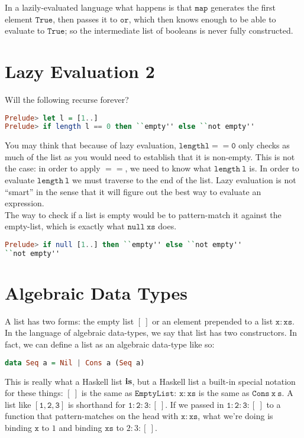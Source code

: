 \documentclass[a4paper,12pt]{article}
\newcommand{\kwa}[1]{\mathtt{#1}}
\begin{document}
\noindent
In a lazily-evaluated language what happens is that $\kwa{map}$ generates the first element $\kwa{True}$, then passes it to $\kwa{or}$, which then knows enough to be able to evaluate to $\kwa{True}$; so the intermediate list of booleans is never fully constructed.\\

\section{Lazy Evaluation 2}

\noindent
Will the following recurse forever?
\begin{lstlisting}[language=Haskell]
Prelude> let l = [1..]
Prelude> if length l == 0 then ``empty'' else ``not empty''
\end{lstlisting}

\noindent
You may think that because of lazy evaluation, $\kwa{length l == 0}$ only checks as much of the list as you would need to establish that it is non-empty. This is not the case: in order to apply $\kwa{==}$, we need to know what $\kwa{length~l}$ is. In order to evaluate $\kwa{length~l}$ we must traverse to the end of the list. Lazy evaluation is not ``smart'' in the sense that it will figure out the best way to evaluate an expression. \\

\noindent
The way to check if a list is empty would be to pattern-match it against the empty-list, which is exactly what $\kwa{null~xs}$ does.

\begin{lstlisting}[language=Haskell]
Prelude> if null [1..] then ``empty'' else ``not empty''
``not empty''
\end{lstlisting}

\section{Algebraic Data Types}

\noindent
A list has two forms: the empty list $\kwa{[~]}$ or an element prepended to a list $\kwa{x:xs}$. In the language of algebraic data-types, we say that list has two constructors. In fact, we can define a list as an algebraic data-type like so:

\begin{lstlisting}[language=Haskell]
data Seq a = Nil | Cons a (Seq a)
\end{lstlisting}

\noindent
This is really what a Haskell list $\bf{is}$, but a Haskell list a built-in special notation for these things: $[~]$ is the same as $\kwa{EmptyList}$: $\kwa{x:xs}$ is the same as $\kwa{Cons~x~s}$. A list like $\kwa{[1,2,3]}$ is shorthand for $\kwa{1:2:3:[~]}$. If we passed in $\kwa{1:2:3:[~]}$ to a function that pattern-matches on the head with $\kwa{x:xs}$, what we're doing is binding $\kwa{x}$ to $1$ and binding $\kwa{xs}$ to $2:3:[~]$. \\
\end{document}
